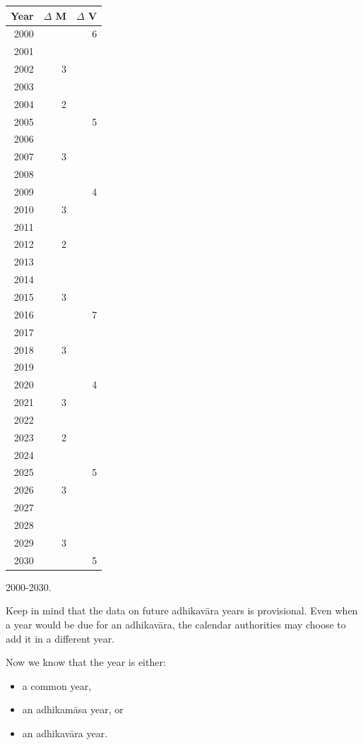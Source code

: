 \documentclass[11pt,oneside]{memoir-article}
\begin{document}
\begin{margintable}[-100mm]
\begin{center}
\begin{tabular}{rrr}
Year & $\Delta$ M & $\Delta$ V\\
\hline
2000 &  & 6\\
2001 &  & \\
2002 & 3 & \\
2003 &  & \\
2004 & 2 & \\
2005 &  & 5\\
2006 &  & \\
2007 & 3 & \\
2008 &  & \\
2009 &  & 4\\
2010 & 3 & \\
2011 &  & \\
2012 & 2 & \\
2013 &  & \\
2014 &  & \\
2015 & 3 & \\
2016 &  & 7\\
2017 &  & \\
2018 & 3 & \\
2019 &  & \\
2020 &  & 4\\
2021 & 3 & \\
2022 &  & \\
2023 & 2 & \\
2024 &  & \\
2025 &  & 5\\
2026 & 3 & \\
2027 &  & \\
2028 &  & \\
2029 & 3 & \\
2030 &  & 5\\
\end{tabular}
\end{center}
\caption{\label{tbl-cycle-adhikamasa-adhikavara-short} 2000-2030.}
\end{margintable}

Keep in mind that the data on future adhikavāra years is provisional. Even when
a year would be due for an adhikavāra, the calendar authorities may choose to
add it in a different year.

Now we know that the year is either:

\begin{itemize}
\item a common year,
\item an adhikamāsa year, or
\item an adhikavāra year.
\end{itemize}
\end{document}
